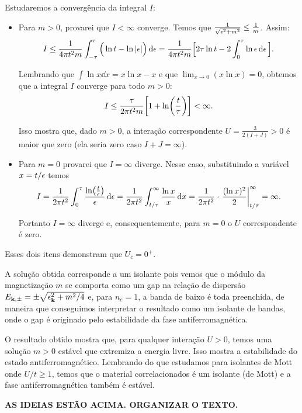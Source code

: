 \documentclass[a4paper,10pt]{article}
\begin{document}
\n

Estudaremos a convergência da integral $I$:
\begin{itemize}
\item Para $m > 0$, provarei que $I < \infty$ converge. Temos que $\frac{1}{\sqrt{\epsilon^2+m^2}} \leq \frac{1}{m}$. Assim:
$$
I \leq \frac{1}{4\pi t^2 m} \int_{-\tau}^{\tau} \Big( \ln t - \ln\abs{\epsilon} \Big) \dd{\epsilon} =
\frac{1}{4\pi t^2 m} \Big[ 2\tau \ln t - 2 \int_{0}^{\tau} \ln\epsilon \dd{\epsilon} \Big] .
$$

Lembrando que $\int \ln x \dd{x} = x \ln x - x$ e que $\displaystyle{\lim_{x\to 0} (x \ln x) = 0}$, obtemos que a integral $I$ converge para todo $m > 0$:
$$
I \leq \frac{\tau}{2\pi t^2 m} \qty[1 + \ln(\frac{t}{\tau})] < \infty.
$$

Isso mostra que, dado $m > 0$, a interação correspondente $U = \frac{3}{2(I+J)} > 0$ é maior que zero (ela seria zero caso $I + J = \infty$).

\item Para $m = 0$ provarei que $I = \infty$ diverge. Nesse caso, substituindo a variável $x = t/\epsilon$ temos
$$
I = \frac{1}{2\pi t^2} \int_{0}^{\tau} \frac{\ln(\frac{t}{\eps})}{\eps} \dd{\eps} =
\frac{1}{2\pi t^2}
\int_{t/\tau}^{\infty} \frac{\ln x}{x} \dd{x} =
\frac{1}{2\pi t^2} \cdot \eval{\frac{(\ln x)^2}{2}}_{t/\tau}^{\infty} = \infty.
$$

Portanto $I = \infty$ diverge e, consequentemente, para $m = 0$ o $U$ correspondente é zero.
\end{itemize}

Esses dois itens demonstram que $U_c = 0^+$.

A solução obtida corresponde a um isolante pois vemos que o módulo da magnetização $m$ se comporta como um gap na relação de dispersão $E_{\vb{k},\pm} = \pm \sqrt{\epsilon_{\vb{k}}^2 + m^2/4}$ e, para $n_e = 1$, a banda de baixo é toda preenchida, de maneira que conseguimos interpretar o resultado como um isolante de bandas, onde o gap é originado pelo estabilidade da fase antiferromagnética.

O resultado obtido mostra que, para qualquer interação $U > 0$, temos uma solução $m > 0$ estável que extremiza a energia livre. Isso mostra a estabilidade do estado antiferromagnético. Lembrando do que estudamos para isolantes de Mott onde $U/t \geq 1$, temos que o material correlacionados é um isolante (de Mott) e a fase antiferromagnética também é estável.

\textbf{AS IDEIAS ESTÃO ACIMA. ORGANIZAR O TEXTO.}
\end{document}
